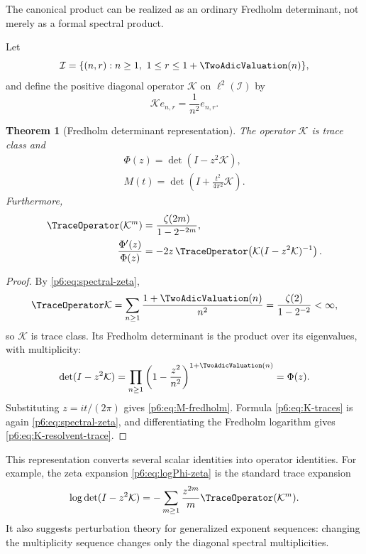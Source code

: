 \documentclass[11pt]{article}
\newtheorem{theorem}{Theorem}[section]
\theoremstyle{definition}
\theoremstyle{remark}
\newcommand{\cK}{\mathcal K}
\begin{document}
The canonical product can be realized as an ordinary Fredholm determinant, not merely as a
formal spectral product.

\begin{definition}
Let
\begin{equation}
 \mathcal I=\{(n,r):n\ge1,\ 1\le r\le 1+\TwoAdicValuation(n)\},
\end{equation}
and define the positive diagonal operator \(\cK\) on \(\ell^2(\mathcal I)\) by
\begin{equation}
 \cK e_{n,r}=\frac1{n^2}e_{n,r}.                             \label{p6:eq:K-def}
\end{equation}
\end{definition}

\begin{theorem}[Fredholm determinant representation]\label{p6:thm:fredholm}
The operator \(\cK\) is trace class and
\begin{align}
 \boxed{\Phi(z)=\det(I-z^2\cK)},                             \label{p6:eq:Phi-fredholm}\\
 \boxed{M(t)=\det\!\left(I+\frac{t^2}{4\pi^2}\cK\right)}.  \label{p6:eq:M-fredholm}
\end{align}
Furthermore,
\begin{align}
 \TraceOperator(\cK^m)&=\frac{\zeta(2m)}{1-2^{-2m}},        \label{p6:eq:K-traces}\\
 \frac{\Phi'(z)}{\Phi(z)}
 &=-2z\,\TraceOperator\!\left(\cK(I-z^2\cK)^{-1}\right). \label{p6:eq:K-resolvent-trace}
\end{align}
\end{theorem}

\begin{proof}
By \eqref{p6:eq:spectral-zeta},
\[
 \TraceOperator\cK=\sum_{n\ge1}\frac{1+\TwoAdicValuation(n)}{n^2}
 =\frac{\zeta(2)}{1-2^{-2}}<\infty,
\]
so \(\cK\) is trace class.  Its Fredholm determinant is the product over its eigenvalues,
with multiplicity:
\[
 \det(I-z^2\cK)
 =\prod_{n\ge1}\left(1-\frac{z^2}{n^2}\right)^{1+\TwoAdicValuation(n)}
 =\Phi(z).
\]
Substituting \(z=it/(2\pi)\) gives \eqref{p6:eq:M-fredholm}.  Formula
\eqref{p6:eq:K-traces} is again \eqref{p6:eq:spectral-zeta}, and differentiating the Fredholm
logarithm gives \eqref{p6:eq:K-resolvent-trace}.
\end{proof}

\begin{remark}
This representation converts several scalar identities into operator identities.  For
example, the zeta expansion \eqref{p6:eq:logPhi-zeta} is the standard trace expansion
\[
 \log\det(I-z^2\cK)=-\sum_{m\ge1}\frac{z^{2m}}m\TraceOperator(\cK^m).
\]
It also suggests perturbation theory for generalized exponent sequences: changing the
multiplicity sequence changes only the diagonal spectral multiplicities.
\end{remark}
\end{document}
